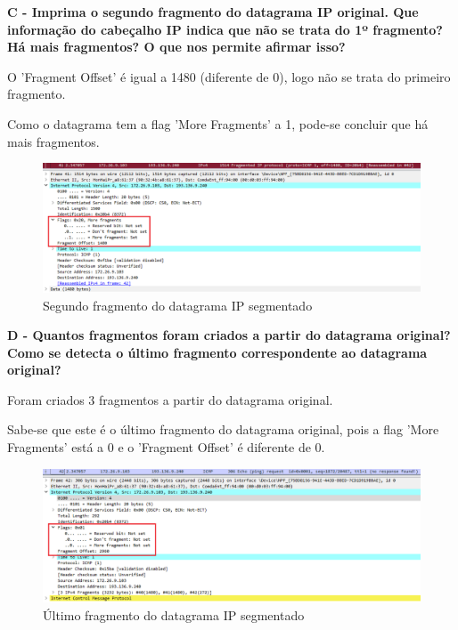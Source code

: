 \documentclass[11pt]{article}
\begin{document}
\clearpage

\textbf{C - Imprima o segundo fragmento do datagrama IP original. Que informação do cabeçalho IP indica que não se trata do 1º fragmento? Há mais fragmentos? O que nos permite afirmar isso?}

O 'Fragment Offset' é igual a 1480 (diferente de 0), logo não se trata do primeiro fragmento.

Como o datagrama tem a flag 'More Fragments' a 1, pode-se concluir que há mais fragmentos.

\begin{figure}[hbt!]
    \centering
    \includegraphics[width=\textwidth]{images/parte1/3252/segundo_fragmento.png}
    \caption{Segundo fragmento do datagrama IP segmentado}
\end{figure}

\vspace{0.4cm}

\textbf{D - Quantos fragmentos foram criados a partir do datagrama original? Como se detecta o último fragmento correspondente ao datagrama original?}

Foram criados 3 fragmentos a partir do datagrama original.

Sabe-se que este é o último fragmento do datagrama original, pois a flag 'More Fragments' está a 0 e o 'Fragment Offset' é diferente de 0.

\begin{figure}[hbt!]
    \centering
    \includegraphics[width=\textwidth]{images/parte1/3252/ultimo_fragmento.png}
    \caption{Último fragmento do datagrama IP segmentado}
\end{figure}
\end{document}
